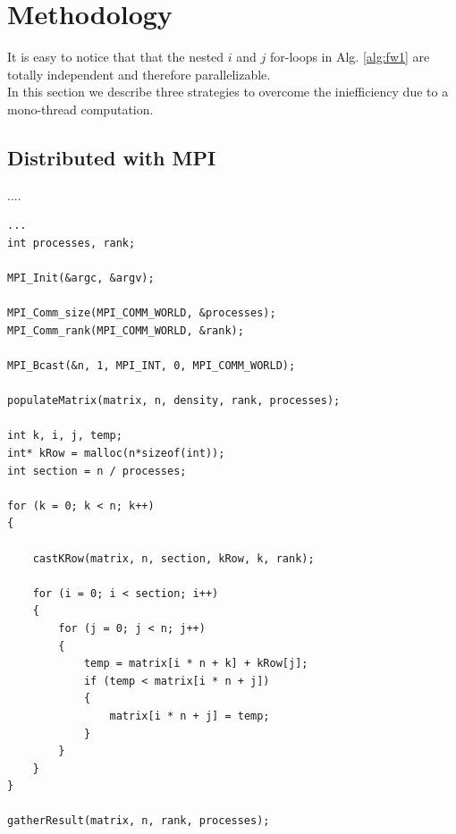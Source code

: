 \section{Methodology}
It is easy to notice that that the nested $i$ and $j$ for-loops in Alg. \ref*{alg:fw1} are totally independent and therefore parallelizable. \\
In this section we describe three strategies to overcome the iniefficiency due to a mono-thread computation.


\subsection{Distributed with MPI}

....



\begin{lstlisting}[style=CStyle]
...
int processes, rank;

MPI_Init(&argc, &argv);

MPI_Comm_size(MPI_COMM_WORLD, &processes);
MPI_Comm_rank(MPI_COMM_WORLD, &rank);

MPI_Bcast(&n, 1, MPI_INT, 0, MPI_COMM_WORLD);

populateMatrix(matrix, n, density, rank, processes);

int k, i, j, temp;
int* kRow = malloc(n*sizeof(int));
int section = n / processes;

for (k = 0; k < n; k++) 
{
	
	castKRow(matrix, n, section, kRow, k, rank);
	
	for (i = 0; i < section; i++)
	{
		for (j = 0; j < n; j++) 
		{
			temp = matrix[i * n + k] + kRow[j];
			if (temp < matrix[i * n + j])
			{
				matrix[i * n + j] = temp;
			}
		}
	}
}

gatherResult(matrix, n, rank, processes);
\end{lstlisting}






























